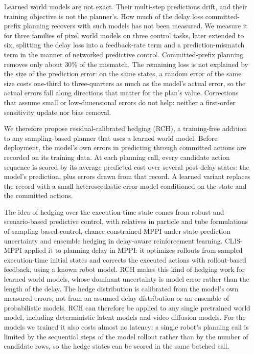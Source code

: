 \documentclass[aps,physrev,\manuscriptlayout,superscriptaddress,
  longbibliography,amsmath,amssymb]{revtex4-2}
\begin{document}
Learned world models are not exact. Their multi-step predictions drift\cite{janner2019mbpo}, and their training objective is not the planner's\cite{lambert2020objective}. How much of the delay loss committed-prefix planning recovers with such models has not been measured. We measure it for three families of pixel world models on three control tasks, later extended to six, splitting the delay loss into a feedback-rate term and a prediction-mismatch term in the manner of networked predictive control\cite{beger2025optimal}. Committed-prefix planning removes only about 30\% of the mismatch. The remaining loss is not explained by the size of the prediction error: on the same states, a random error of the same size costs one-third to three-quarters as much as the model's actual error, so the actual errors fall along directions that matter for the plan's value. Corrections that assume small or low-dimensional errors do not help: neither a first-order sensitivity update\cite{zavala2009asnmpc,belvedere2026feedback} nor bias removal.

We therefore propose residual-calibrated hedging (RCH), a training-free addition to any sampling-based planner that uses a learned world model. Before deployment, the model's own errors in predicting through committed actions are recorded on its training data. At each planning call, every candidate action sequence is scored by its average predicted cost over several post-delay states: the model's prediction, plus errors drawn from that record. A learned variant replaces the record with a small heteroscedastic error model conditioned on the state and the committed actions.

The idea of hedging over the execution-time state comes from robust and scenario-based predictive control\cite{calafiore2006scenario,lucia2013multistage}, with relatives in particle and tube formulations of sampling-based control\cite{dyro2021particle,gandhi2021robust}, chance-constrained MPPI under state-prediction uncertainty\cite{serfling2026ccmppi} and ensemble hedging in delay-aware reinforcement learning\cite{chen2020dats}. CLIS-MPPI\cite{liu2026clis} applied it to planning delay in MPPI: it optimizes rollouts from sampled execution-time initial states and corrects the executed actions with rollout-based feedback, using a known robot model. RCH makes this kind of hedging work for learned world models, whose dominant uncertainty is model error rather than the length of the delay. The hedge distribution is calibrated from the model's own measured errors, not from an assumed delay distribution or an ensemble of probabilistic models\cite{chua2018pets,chen2020dats}. RCH can therefore be applied to any single pretrained world model, including deterministic latent models and video diffusion models. For the models we trained it also costs almost no latency: a single robot's planning call is limited by the sequential steps of the model rollout rather than by the number of candidate rows, so the hedge states can be scored in the same batched call.
\end{document}

